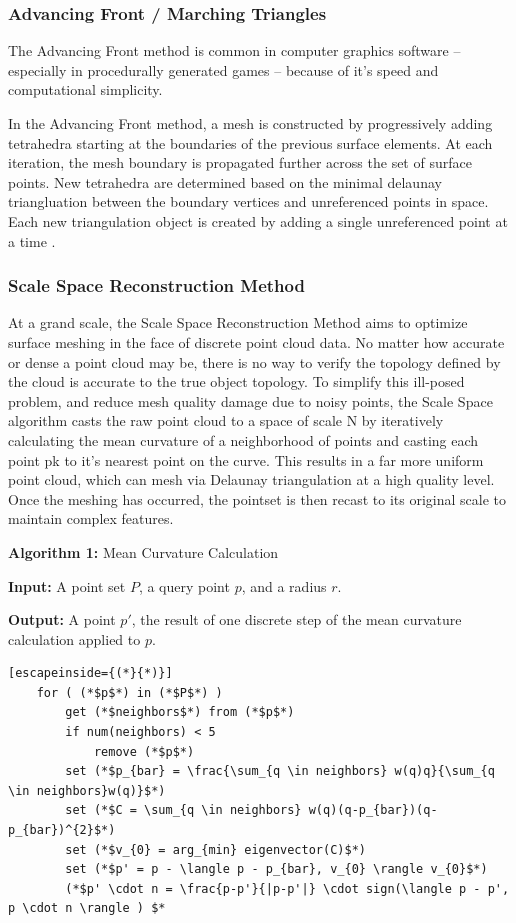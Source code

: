 \documentclass[12pt]{drexelthesis}
\let\Oldsubsubsection\subsubsection
\renewcommand{\subsubsection}{\FloatBarrier\Oldsubsubsection}
\begin{document}
\subsubsection{Advancing Front / Marching Triangles}
The Advancing Front method is common in computer graphics software – especially in procedurally generated games – because of it’s speed and computational simplicity.

In the Advancing Front method, a mesh is constructed by progressively adding tetrahedra starting at the boundaries of the previous surface elements. At each iteration, the mesh boundary is propagated further across the set of surface points. New tetrahedra are determined based on the minimal delaunay triangluation between the boundary vertices and unreferenced points in space. Each new triangulation object is created by adding a single unreferenced point at a time \cite{RN66}.

\subsubsection{Scale Space Reconstruction Method}
At a grand scale, the Scale Space Reconstruction Method aims to optimize surface meshing in the face of discrete point cloud data. No matter how accurate or dense a point cloud may be, there is no way to verify the topology defined by the cloud is accurate to the true object topology. To simplify this ill-posed problem, and reduce mesh quality damage due to noisy points, the Scale Space algorithm casts the raw point cloud to a space of scale N by iteratively calculating the mean curvature of a neighborhood of points and casting each point pk to it’s nearest point on the curve. This results in a far more uniform point cloud, which can mesh via Delaunay triangulation at a high quality level. Once the meshing has occurred, the pointset is then recast to its original scale to maintain complex features. 

\textbf{Algorithm 1:} Mean Curvature Calculation

	\textbf{Input:} A point set $P$, a query point $p$, and a radius $r$.
	
	\textbf{Output:} A point $p'$, the result of one discrete step of the mean curvature calculation applied to $p$.
\begin{lstlisting}[escapeinside={(*}{*)}]
	for ( (*$p$*) in (*$P$*) )
		get (*$neighbors$*) from (*$p$*)
		if num(neighbors) < 5
			remove (*$p$*)
		set (*$p_{bar} = \frac{\sum_{q \in neighbors} w(q)q}{\sum_{q \in neighbors}w(q)}$*)
		set (*$C = \sum_{q \in neighbors} w(q)(q-p_{bar})(q-p_{bar})^{2}$*)
		set (*$v_{0} = arg_{min} eigenvector(C)$*)
		set (*$p' = p - \langle p - p_{bar}, v_{0} \rangle v_{0}$*)
		(*$p' \cdot n = \frac{p-p'}{|p-p'|} \cdot sign(\langle p - p', p \cdot n \rangle ) $*	
\end{lstlisting}
\end{document}
